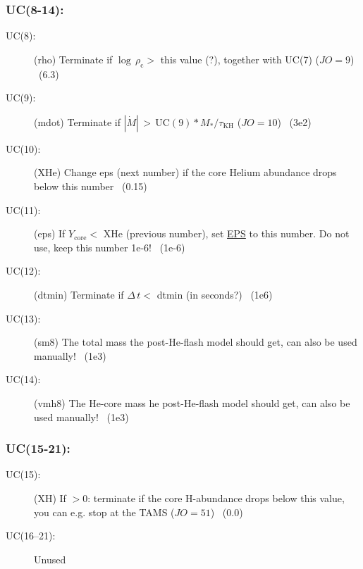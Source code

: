 \subsubsection*{UC(8-14):}
\begin{description}
\item[UC(8):]  (rho)   Terminate if $\log\,\rho_\mathrm{c} >$ this value (?), together with UC(7) ($JO=9$)  ~(6.3) 
\item[UC(9):]  (mdot)  Terminate if $|\dot{M}| \,>\, \mathrm{UC}(9)*M_*/\tau_\mathrm{KH}$  ($JO=10$)  ~(3e2) 
\item[UC(10):] (XHe)   Change eps (next number) if the core Helium abundance drops below this number ~(0.15)
\item[UC(11):] (eps)   If $Y_\mathrm{core} <$ XHe (previous number), set \hyperlink{eps}{EPS} to this number.  Do not use, keep this number 1e-6!  ~(1e-6)
\item[UC(12):] (dtmin) Terminate if $\Delta\,t <$ dtmin (in seconds?) ~(1e6)
\item[UC(13):] (sm8)   The total mass the post-He-flash model should get, can also be used manually!  ~(1e3)
\item[UC(14):] (vmh8)  The He-core mass he post-He-flash model should get, can also be used manually!  ~(1e3)
\end{description}


\subsubsection*{UC(15-21):}
\begin{description}
\item[UC(15):] (XH)    If $>0$: terminate if the core H-abundance drops below this value, you can e.g. stop at the TAMS ($JO=51$) ~(0.0)
\item[UC(16--21):]   Unused
\end{description}


